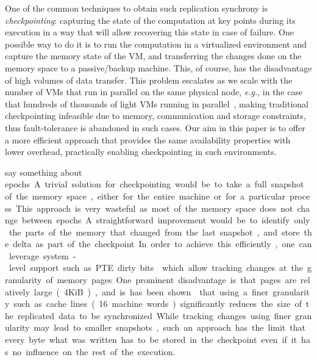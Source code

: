 One of the common techniques to obtain such replication synchrony is \emph{checkpointing}: capturing the state of the computation at key points during its execution
in a way that will allow recovering this state in case of failure.
One possible way to do it is to run the computation in a virtualized environment and capture the memory state of the VM, and transferring the changes done on the memory space to a passive/backup machine.
This, of course, has the disadvantage of high volumes of data transfer. This problem escalates as we scale with the number of VMs that run in parallel on the same physical node, {\it e.g.}, in the case that hundreds of thousands of light VMs running in parallel~\cite{Firecracker}, making traditional checkpointing infeasible 
due to memory, communication and storage constraints, thus fault-tolerance is abandoned in such cases.   
Our aim in this paper is to offer a more efficient approach that provides the same availability properties with lower overhead, practically enabling checkpointing in such environments. 

\SI{say something about epochs}


A trivial solution for checkpointing would be to take a full snapshot of the memory space, either for the entire machine or for a particular process. This approach is very wasteful as most of the memory space does not change between epochs. A straightforward improvement would be to identify only the parts of the memory that changed from the last snapshot, and store the delta as part of the checkpoint.
In order to achieve this efficiently, one can leverage system-level support such as PTE dirty bits~\cite{glausch16pml} 
which allow tracking changes at the granularity of memory pages.
One prominent disadvantage is that pages are relatively large (4KiB), and is has been shown~\cite{MoshikSOCC22} that using a finer granularity such as cache lines (16 machine words) significantly reduces the size of the replicated data to be synchronized. While tracking changes using finer granularity may lead to smaller snapshots, such an approach has the limit that every byte what was written has to be stored in the checkpoint even if it has no influence on the rest of the execution. 

